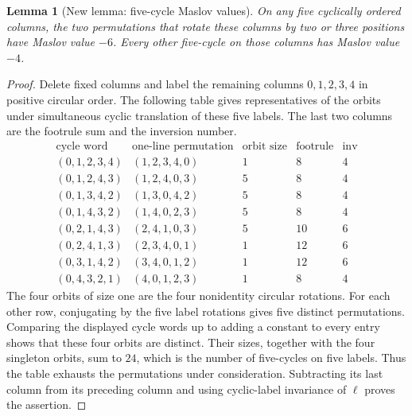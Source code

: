 \documentclass[11pt,oneside]{report}
\newtheorem{lemma}[theorem]{Lemma}
\theoremstyle{definition}
\numberwithin{equation}{section}
\begin{document}
\begin{lemma}[New lemma: five-cycle Maslov values]
\label{J21:lem:torus-five-cycle-table}
On any five cyclically ordered columns, the two permutations that
rotate these columns by two or three positions have Maslov value $-6$.
Every other five-cycle on those columns has Maslov value $-4$.
\end{lemma}
\begin{proof}
Delete fixed columns and label the remaining columns $0,1,2,3,4$ in
positive circular order. The following table gives representatives of
the orbits under simultaneous cyclic translation of these five labels.
The last two columns are the footrule sum and the inversion number.
\[
\begin{array}{c|c|r|r|r}
 \text{cycle word}&\text{one-line permutation}&\text{orbit size}
       &\text{footrule}&\operatorname{inv}\\\hline
 (0,1,2,3,4)&(1,2,3,4,0)&1&8&4\\
 (0,1,2,4,3)&(1,2,4,0,3)&5&8&4\\
 (0,1,3,4,2)&(1,3,0,4,2)&5&8&4\\
 (0,1,4,3,2)&(1,4,0,2,3)&5&8&4\\
 (0,2,1,4,3)&(2,4,1,0,3)&5&10&6\\
 (0,2,4,1,3)&(2,3,4,0,1)&1&12&6\\
 (0,3,1,4,2)&(3,4,0,1,2)&1&12&6\\
 (0,4,3,2,1)&(4,0,1,2,3)&1&8&4
\end{array}
\]
The four orbits of size one are the four nonidentity circular rotations.
For each other row, conjugating by the five label rotations gives five
distinct permutations. Comparing the displayed cycle words up to adding
a constant to every entry shows that these four orbits are distinct.
Their sizes, together with the four singleton orbits, sum to $24$,
which is the number of five-cycles on five labels. Thus the table
exhausts the permutations under consideration. Subtracting its last
column from its preceding column and using cyclic-label invariance of
$\ell$ proves the assertion.
\end{proof}
\end{document}
